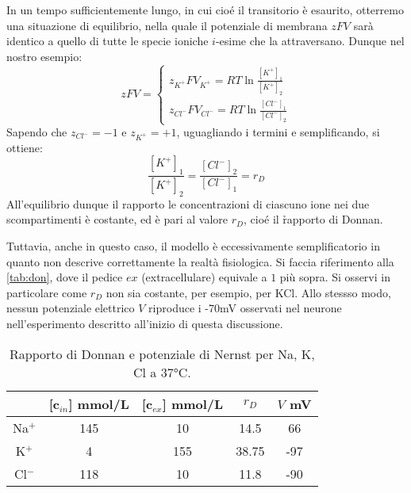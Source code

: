 
In un tempo sufficientemente lungo, in cui cioé il transitorio è esaurito, otterremo una situazione di equilibrio, nella quale il potenziale di membrana $zFV$ sarà identico a quello di tutte le specie ioniche $i$-esime che la attraversano. Dunque nel nostro esempio:
\begin{equation*}
    zFV = 
    \begin{cases}
        z_{K^+}FV_{K^+} = RT \ln{\displaystyle\frac{[K^+]_1}{[K^+]_2}} \\
        z_{Cl^-}FV_{Cl^-} = RT \ln{\displaystyle\frac{[Cl^-]_1}{[Cl^-]_2}}
    \end{cases}
\end{equation*}
Sapendo che $z_{Cl^-} = -1$ e $z_{K^+}=+1$, uguagliando i termini e semplificando, si ottiene:
\begin{equation*}
    \frac{[K^+]_1}{[K^+]_2} = \frac{[Cl^-]_2}{[Cl^-]_1} = r_D
\end{equation*}
All'equilibrio dunque il rapporto le concentrazioni di ciascuno ione nei due scompartimenti è costante, ed è pari al valore $r_D$, cioé il \h{rapporto di Donnan}.

Tuttavia, anche in questo caso, il modello è eccessivamente semplificatorio in quanto non descrive correttamente la realtà fisiologica. Si faccia riferimento alla \autoref{tab:don}, dove il pedice $ex$ (extracellulare) equivale a $1$ più sopra. Si osservi in particolare come $r_D$ non sia costante, per esempio, per KCl. Allo stessso modo, nessun potenziale elettrico $V$ riproduce i -70mV osservati nel neurone nell'esperimento descritto all'inizio di questa discussione.

\begin{table}[h]
    \centering
    \begin{tabular}{ | c | c | c | c | c |}
        \hline
        \       & [c$_{in}$] mmol/L & [c$_{ex}$]  mmol/L& $r_D$   & $V$ mV \\
        \hline
        Na$^+$   & 145 & 10 & 14.5 & 66 \\
        \hline
        K$^+$   & 4 & 155 & 38.75 & -97 \\
        \hline
        Cl$^-$   & 118 & 10 & 11.8 & -90 \\
        \hline
    \end{tabular}
    \caption{Rapporto di Donnan e potenziale di Nernst per Na, K, Cl a 37°C.}
    \label{tab:don}
\end{table}

